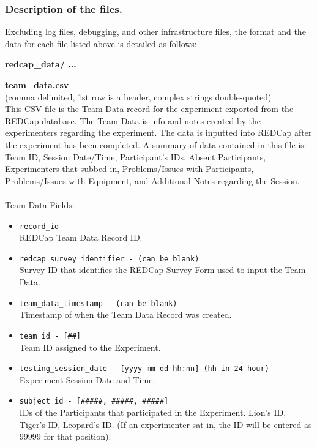 \subsubsection{Description of the files.}

\noindent
Excluding log files, debugging, and other infrastructure files, the format and
the data for each file listed above is detailed as follows: \\


\begin{description}
\item\textbf{redcap\_data/ ...}

    \begin{addmargin}[0em]{0em} %
        \textbf{team\_data.csv}\\(comma delimited, 1st row is a header, complex strings double-quoted)\\
        This CSV file is the Team Data record for the experiment exported from the REDCap database.
        The Team Data is info and notes created by the experimenters regarding the experiment.
        The data is inputted into REDCap after the experiment has been completed.
        A summary of data contained in this file is: Team ID, Session Date/Time, Participant's IDs, Absent Participants,
        Experimenters that subbed-in, Problems/Issues with Participants, Problems/Issues with Equipment, and Additional Notes regarding the Session.\\\\
        Team Data Fields:
        \begin{itemize}
            \item \verb|record_id -|\\REDCap Team Data Record ID.
            \item \verb|redcap_survey_identifier - (can be blank)|\\Survey ID that identifies the REDCap Survey Form used to input the Team Data.
            \item \verb|team_data_timestamp - (can be blank)|\\Timestamp of when the Team Data Record was created.
            \item \verb|team_id - [##]|\\Team ID assigned to the Experiment.
            \item \verb|testing_session_date - [yyyy-mm-dd hh:nn] (hh in 24 hour)|\\Experiment Session Date and Time.
            \item \verb|subject_id - [#####, #####, #####]|\\IDs of the Participants that participated in the Experiment. Lion's ID, Tiger's ID, Leopard's ID. (If an experimenter sat-in, the ID will be entered as 99999 for that position).

\end{itemize}
\end{addmargin}
\end{description}
